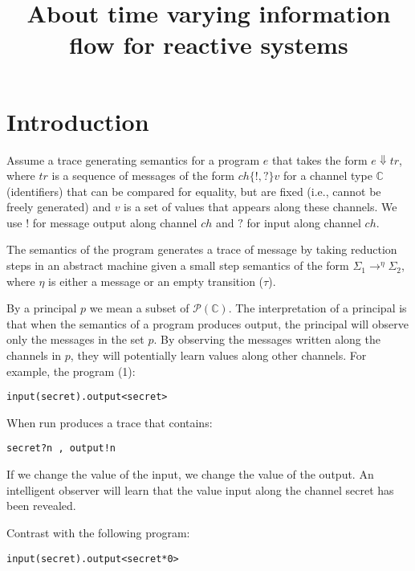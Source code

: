 \documentclass{article}
\begin{document}
\title{About time varying information flow for reactive systems}
\maketitle

\section{Introduction}

Assume a trace generating semantics for a program $e$ that takes the
form $e \Downarrow tr$, where $tr$ is a sequence of messages of the
form $ch \{!,?\} v$ for a channel type $\mathbb{C}$ (identifiers) that
can be compared for equality, but are fixed (i.e., cannot be freely
generated) and $v$ is a set of values that appears along these
channels.  We use $!$ for message output along channel $ch$ and $?$
for input along channel $ch$.

The semantics of the program generates a trace of message by taking
reduction steps in an abstract machine given a small step semantics of
the form $\Sigma_1 \to^\eta \Sigma_2$, where $\eta$ is either a
message or an empty transition ($\tau$).

By a principal $p$ we mean a subset of $\mathcal{P}(\mathbb{C})$.  The
interpretation of a principal is that when the semantics of a program
produces output, the principal will observe only the messages in the
set $p$.  By observing the messages written along the channels in $p$,
they will potentially learn values along other channels.  For example,
the program (1):

\begin{lstlisting}[float,caption=My caption here,label=ex1]
input(secret).output<secret>
\end{lstlisting}

When run produces a trace that contains:

\begin{verbatim}
secret?n , output!n
\end{verbatim}

If we change the value of the input, we change the value of the
output.  An intelligent observer will learn that the value input along
the channel secret has been revealed.

Contrast with the following program:

\begin{lstlisting}[float,caption=My caption here,label=ex2]
input(secret).output<secret*0>
\end{lstlisting}
\end{document}
